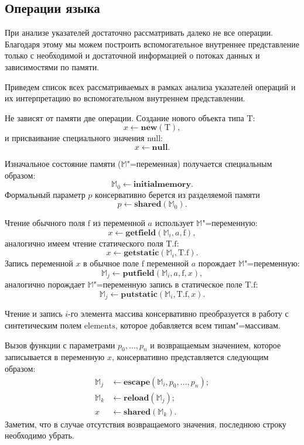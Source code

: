 \documentclass[14pt,titlepage,draft]{extarticle}
\newcommand{\java}{\eng{Java}\xspace}
\newcommand{\M}{\ensuremath{\mathbb{M}}}
\newcommand{\type}[1]{\mathrm{#1}}
\newcommand{\field}[1]{\mathrm{#1}}
\newcommand{\sfield}[2]{\type{#1}.\field{#2}}
\newcommand{\op}[1]{\mathbf{#1}}
\begin{document}
  \subsection{Операции языка \texorpdfstring{\java}{Java}}
    \label{section:java_ops}

    При анализе указателей достаточно рассматривать далеко не все операции.
    Благодаря этому мы можем построить вспомогательное внутреннее
    представление только с необходимой и достаточной информацией о потоках
    данных и зависимостями по памяти.

    Приведем список всех рассматриваемых в рамках анализа указателей операций
    и их интерпретацию во вспомогательном внутреннем представлении.

    Не зависят от памяти две операции. Создание нового объекта типа
    $\type{T}$:
    \[ x \gets \op{new}(\type{T}), \]
    и присваивание специального значения null:
    \[ x \gets \op{null}. \]

    Изначальное состояние памяти (\M"=переменная) получается специальным
    образом:
    \[ \M_0 \gets \op{initialmemory}. \]
    Формальный параметр $p$ консервативно берется из разделяемой памяти
    \[ p \gets \op{shared}(\M_0). \]

    Чтение обычного поля $\field{f}$ из переменной $a$ использует
    \M"=переменную:
    \[ x \gets \op{getfield}(\M_i, a, \field{f}), \]
    аналогично имеем чтение статического поля $\sfield{T}{f}$:
    \[ x \gets \op{getstatic}(\M_i, \sfield{T}{f}). \]
    Запись переменной $x$ в обычное поле $\field{f}$ переменной $a$ порождает
    \M"=переменную:
    \[ \M_j \gets \op{putfield}(\M_i, a, \field{f}, x), \]
    аналогично порождает \M"=переменную запись в статическое поле
    $\sfield{T}{f}$:
    \[ \M_j \gets \op{putstatic}(\M_i, \sfield{T}{f}, x). \]

    Чтение и запись $i$-го элемента массива консервативно преобразуется в
    работу с синтетическим полем $\field{elements}$, которое добавляется всем
    типам"=массивам.

    Вызов функции с параметрами $p_0, \ldots, p_n$ и возвращаемым значением,
    которое записывается в переменную $x$, консервативно представляется
    следующим образом:
    \[\begin{aligned}
      \M_j &\gets \op{escape}(\M_i, p_0, \ldots, p_n); \\
      \M_k &\gets \op{reload}(\M_j); \\
      x    &\gets \op{shared}(\M_k).
    \end{aligned}\]
    Заметим, что в случае отсутствия возвращаемого значения, последнюю строку
    необходимо убрать.
\end{document}
